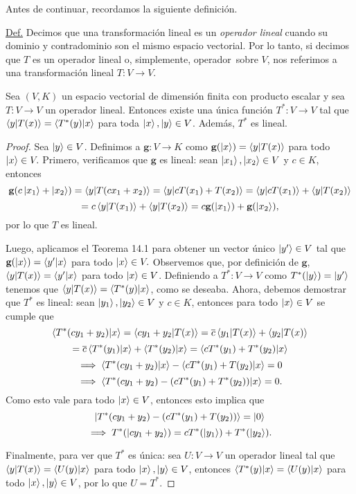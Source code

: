 \documentclass[12pt,dvipsnames]{article}
\newenvironment{teorema}[2][Teorema]{\begin{trivlist}
\item[\hskip \labelsep {\bfseries #1}\hskip \labelsep {\bfseries #2.}]}{\end{trivlist}}
\begin{document}
Antes de continuar, recordamos la siguiente definición.

\hspace{5mm} 
\begin{tcolorbox}
    \underline{Def.} Decimos que una transformación lineal es un \emph{operador lineal} cuando su dominio y contradominio son el mismo espacio vectorial. Por lo tanto, si decimos que $T$ es un operador lineal \textemdash o, simplemente, operador\textemdash \ sobre $V$, nos referimos a una transformación lineal $T:V\to V$.
\end{tcolorbox}

\vspace{3mm}

\begin{teorema}{14.2}
    Sea $(V,K)$ un espacio vectorial de dimensión finita con producto escalar y sea $T:V\to V$ un operador lineal. Entonces existe una única función $T^*:V\to V$ tal que $\braket{y|T(x)}=\braket{T^*(y)|x}$ para toda $\ket{x},\ket{y}\in V$. Además, $T^*$ es lineal.
    
    \begin{proof}
        Sea $\ket{y}\in V$. Definimos a $\textbf{g}:V\to K$ como $\textbf{g}(\ket{x})=\braket{y|T(x)}$ para todo $\ket{x}\in V.$ Primero, verificamos que $\textbf{g}$ es lineal: sean $\ket{x_1},\ket{x_2}\in V$ y $c\in K$, entonces $$\textbf{g}(c\ket{x_1}+\ket{x_2})=\braket{y|T(cx_1+x_2)}=\braket{y|cT(x_1)+T(x_2)}=\braket{y|cT(x_1)}+\braket{y|T(x_2)}$$ $$=c\braket{y|T(x_1)}+\braket{y|T(x_2)}=c\textbf{g}(\ket{x_1})+\textbf{g}(\ket{x_2}),$$ por lo que $T$ es lineal.
        
        Luego, aplicamos el Teorema 14.1 para obtener un vector único $\ket{y'}\in V$ tal que $\textbf{g}(\ket{x})=\braket{y'|x}$ para todo $\ket{x}\in V.$ Observemos que, por definición de $\textbf{g}$, $\braket{y|T(x)}=\braket{y'|x}$ para todo $\ket{x}\in V$. Definiendo a $T^*:V\to V$ como $T^*(\ket{y})=\ket{y'}$ tenemos que $\braket{y|T(x)}=\braket{T^*(y)|x}$, como se deseaba. Ahora, debemos demostrar que $T^*$ es lineal: sean $\ket{y_1},\ket{y_2}\in V$ y $c\in K$, entonces para todo $\ket{x}\in V$ se cumple que $$\braket{T^*(cy_1+y_2)|x}=\braket{cy_1+y_2|T(x)}=\overline{c}\braket{y_1|T(x)}+\braket{y_2|T(x)}$$ $$=\overline{c}\braket{T^*(y_1)|x}+\braket{T^*(y_2)|x}=\braket{cT^*(y_1)+T^*(y_2)|x}$$ $$\implies\braket{T^*(cy_1+y_2)|x}-\braket{cT^*(y_1)+T(y_2)|x}=0$$ $$\implies \braket{T^*(cy_1+y_2)-(cT^*(y_1)+T^*(y_2))|x}=0.$$ Como esto vale para todo $\ket{x}\in V$, entonces esto implica que $$ \ket{T^*(cy_1+y_2)-(cT^*(y_1)+T(y_2))}=\ket{0}$$ $$\implies T^*(\ket{cy_1+y_2})=cT^*(\ket{y_1})+T^*(\ket{y_2}).$$
        
        Finalmente, para ver que $T^*$ es única: sea $U:V\to V$ un operador lineal tal que $\braket{y|T(x)}=\braket{U(y)|x}$ para todo $\ket{x},\ket{y}\in V$, entonces $\braket{T^*(y)|x}=\braket{U(y)|x}$ para todo $\ket{x},\ket{y}\in V$, por lo que $U=T^*$.
    \end{proof}
\end{teorema}
\end{document}
